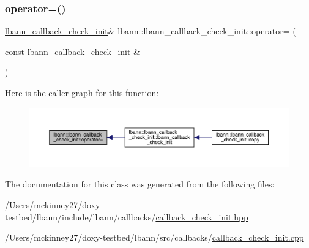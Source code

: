 \mbox{\label{classlbann_1_1lbann__callback__check__init_a7f656e9810d478eba4bebdd77aa45407}} 
\subsubsection{\texorpdfstring{operator=()}{operator=()}}
{\footnotesize\ttfamily \hyperlink{classlbann_1_1lbann__callback__check__init}{lbann\+\_\+callback\+\_\+check\+\_\+init}\& lbann\+::lbann\+\_\+callback\+\_\+check\+\_\+init\+::operator= (\begin{DoxyParamCaption}\item[{const \hyperlink{classlbann_1_1lbann__callback__check__init}{lbann\+\_\+callback\+\_\+check\+\_\+init} \&}]{ }\end{DoxyParamCaption})\hspace{0.3cm}{\ttfamily [default]}}

Here is the caller graph for this function\+:\nopagebreak
\begin{figure}[H]
\begin{center}
\leavevmode
\includegraphics[width=350pt]{classlbann_1_1lbann__callback__check__init_a7f656e9810d478eba4bebdd77aa45407_icgraph}
\end{center}
\end{figure}


The documentation for this class was generated from the following files\+:\begin{DoxyCompactItemize}
\item 
/\+Users/mckinney27/doxy-\/testbed/lbann/include/lbann/callbacks/\hyperlink{callback__check__init_8hpp}{callback\+\_\+check\+\_\+init.\+hpp}\item 
/\+Users/mckinney27/doxy-\/testbed/lbann/src/callbacks/\hyperlink{callback__check__init_8cpp}{callback\+\_\+check\+\_\+init.\+cpp}\end{DoxyCompactItemize}
